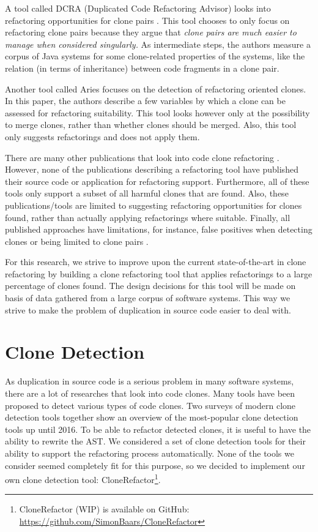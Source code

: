 \documentclass[a4paper]{article}
\begin{document}
A tool called DCRA (Duplicated Code Refactoring Advisor) looks into refactoring opportunities for clone pairs \cite{fontana2012duplicated}. This tool chooses to only focus on refactoring clone pairs because they argue that \textit{clone pairs are much easier to manage when considered singularly.} As intermediate steps, the authors measure a corpus of Java systems for some clone-related properties of the systems, like the relation (in terms of inheritance) between code fragments in a clone pair.

Another tool called Aries \cite{higo2004aries, higo2008metric} focuses on the detection of refactoring oriented clones. In this paper, the authors describe a few variables by which a clone can be assessed for refactoring suitability. This tool looks however only at the possibility to merge clones, rather than whether clones should be merged. Also, this tool only suggests refactorings and does not apply them.

There are many other publications that look into code clone refactoring \cite{alwaqfi2017refactoring, chen2018clone, koni2001scenario}. However, none of the publications describing a refactoring tool have published their source code or application for refactoring support. Furthermore, all of these tools only support a subset of all harmful clones that are found. Also, these publications/tools are limited to suggesting refactoring opportunities for clones found, rather than actually applying refactorings where suitable. Finally, all published approaches have limitations, for instance, false positives when detecting clones \cite{chen2018clone} or being limited to clone pairs \cite{higo2008metric}.

For this research, we strive to improve upon the current state-of-the-art in clone refactoring by building a clone refactoring tool that applies refactorings to a large percentage of clones found. The design decisions for this tool will be made on basis of data gathered from a large corpus of software systems. This way we strive to make the problem of duplication in source code easier to deal with.

\section{Clone Detection}
As duplication in source code is a serious problem in many software systems, there are a lot of researches that look into code clones. Many tools have been proposed to detect various types of code clones. Two surveys of modern clone detection tools \cite{sheneamer2016survey, svajlenko2014evaluating} together show an overview of the most-popular clone detection tools up until 2016. To be able to refactor detected clones, it is useful to have the ability to rewrite the AST. We considered a set of clone detection tools for their ability to support the refactoring process automatically.  None of the tools we consider seemed completely fit for this purpose, so we decided to implement our own clone detection tool: CloneRefactor\footnote{CloneRefactor (WIP) is available on GitHub: \url{https://github.com/SimonBaars/CloneRefactor}}.
\end{document}
